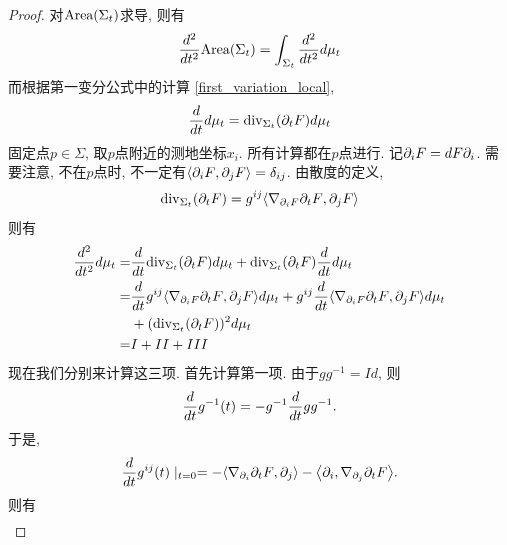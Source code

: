 \begin{proof}
    对$\text{Area}(\Sigma_t)$求导, 则有
    \begin{equation}
        \frac{d^2}{dt^2} \text{Area}(\Sigma_t)=\int_{\Sigma_t} \frac{d^2}{dt^2} {d\mu_t}
    \end{equation}
    而根据第一变分公式中的计算 \eqref{first_variation_local},
    \begin{equation}
        \frac{d}{dt} {d\mu_t}= {\text{div}}_{\Sigma_t}({\partial_t F}) {d\mu_t}
    \end{equation}
    固定点$p \in \Sigma$, 取$p$点附近的测地坐标${x_i}$. 所有计算都在$p$点进行. 记${\partial_i F}=dF{\partial_i}$. 需要注意, 不在$p$点时, 不一定有${\left < {\partial_i F}, {\partial_j F} \right >}=\delta_{ij}$.  由散度的定义,
    \begin{equation}
        {\text{div}}_{\Sigma_t}({\partial_t F})=g^{ij}{\left < \nabla_{{\partial_i F}}{\partial_t F}, {\partial_j F} \right >}
    \end{equation}
    则有
    \begin{equation}
        \begin{split}
            \frac{d^2}{dt^2} {d\mu_t} =& \frac{d}{dt} {\text{div}}_{\Sigma_t}({\partial_t F}){d\mu_t} + {\text{div}}_{\Sigma_t}({\partial_t F})\frac{d}{dt}{d\mu_t} \\
            =& \frac{d}{dt} g^{ij}{\left < \nabla_{{\partial_i F}}{\partial_t F}, {\partial_j F} \right >}{d\mu_t}+ g^{ij}\frac{d}{dt} {\left < \nabla_{{\partial_i F}}{\partial_t F}, {\partial_j F} \right >}{d\mu_t} \\
            &+ ({\text{div}}_{\Sigma_t}({\partial_t F}))^2{d\mu_t} \\
            =& I+II+III
        \end{split}
    \end{equation}
    现在我们分别来计算这三项.  首先计算第一项. 由于$gg^{-1}=Id$, 则
    \begin{equation}
        \frac{d}{dt} g^{-1}(t)=-g^{-1}\frac{d}{dt} g g^{-1}. 
    \end{equation}
    于是,
    \begin{equation}
        \frac{d}{dt} g^{ij}(t)\mid_{t=0} = - {\left < \nabla_{{\partial_i}} {\partial_t F},  {\partial_j} \right >} - {\left < {\partial_i}, \nabla_{{\partial_j}} {\partial_t F} \right >}.
    \end{equation}
    则有
    \begin{equation}
        \begin{split}

\end{split}
\end{equation}
\end{proof}
